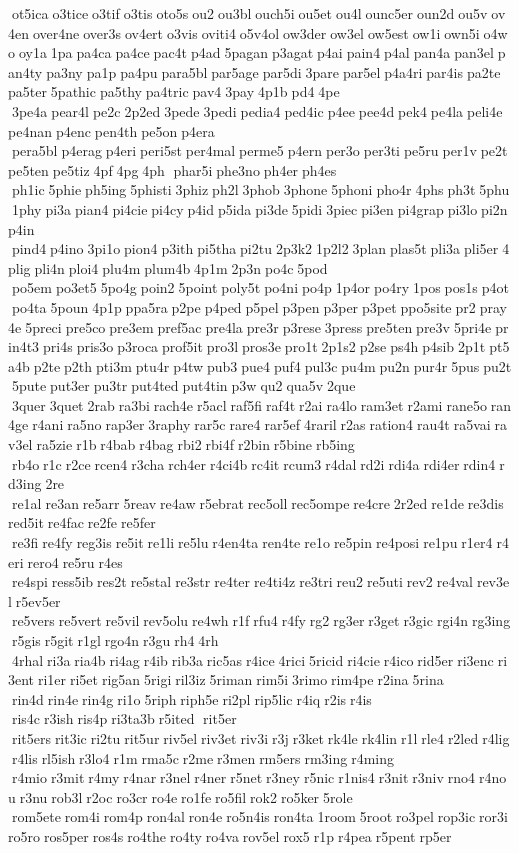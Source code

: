  ot5ica o3tice o3tif o3tis oto5s ou2 ou3bl ouch5i ou5et ou4l ounc5er oun2d ou5v ov4en over4ne over3s ov4ert o3vis oviti4 o5v4ol ow3der ow3el ow5est ow1i own5i o4wo oy1a 1pa pa4ca pa4ce pac4t p4ad 5pagan p3agat p4ai pain4 p4al pan4a pan3el pan4ty pa3ny pa1p pa4pu para5bl par5age par5di 3pare par5el p4a4ri par4is pa2te pa5ter 5pathic pa5thy pa4tric pav4 3pay 4p1b pd4 4pe  3pe4a pear4l pe2c 2p2ed 3pede 3pedi pedia4 ped4ic p4ee pee4d pek4 pe4la peli4e pe4nan p4enc pen4th pe5on p4era  pera5bl p4erag p4eri peri5st per4mal perme5 p4ern per3o per3ti pe5ru per1v pe2t pe5ten pe5tiz 4pf 4pg 4ph  phar5i phe3no ph4er ph4es  ph1ic 5phie ph5ing 5phisti 3phiz ph2l 3phob 3phone 5phoni pho4r 4phs ph3t 5phu 1phy pi3a pian4 pi4cie pi4cy p4id p5ida pi3de 5pidi 3piec pi3en pi4grap pi3lo pi2n p4in  pind4 p4ino 3pi1o pion4 p3ith pi5tha pi2tu 2p3k2 1p2l2 3plan plas5t pli3a pli5er 4plig pli4n ploi4 plu4m plum4b 4p1m 2p3n po4c 5pod  po5em po3et5 5po4g poin2 5point poly5t po4ni po4p 1p4or po4ry 1pos pos1s p4ot po4ta 5poun 4p1p ppa5ra p2pe p4ped p5pel p3pen p3per p3pet ppo5site pr2 pray4e 5preci pre5co pre3em pref5ac pre4la pre3r p3rese 3press pre5ten pre3v 5pri4e prin4t3 pri4s pris3o p3roca prof5it pro3l pros3e pro1t 2p1s2 p2se ps4h p4sib 2p1t pt5a4b p2te p2th pti3m ptu4r p4tw pub3 pue4 puf4 pul3c pu4m pu2n pur4r 5pus pu2t 5pute put3er pu3tr put4ted put4tin p3w qu2 qua5v 2que  3quer 3quet 2rab ra3bi rach4e r5acl raf5fi raf4t r2ai ra4lo ram3et r2ami rane5o ran4ge r4ani ra5no rap3er 3raphy rar5c rare4 rar5ef 4raril r2as ration4 rau4t ra5vai rav3el ra5zie r1b r4bab r4bag rbi2 rbi4f r2bin r5bine rb5ing  rb4o r1c r2ce rcen4 r3cha rch4er r4ci4b rc4it rcum3 r4dal rd2i rdi4a rdi4er rdin4 rd3ing 2re  re1al re3an re5arr 5reav re4aw r5ebrat rec5oll rec5ompe re4cre 2r2ed re1de re3dis red5it re4fac re2fe re5fer  re3fi re4fy reg3is re5it re1li re5lu r4en4ta ren4te re1o re5pin re4posi re1pu r1er4 r4eri rero4 re5ru r4es  re4spi ress5ib res2t re5stal re3str re4ter re4ti4z re3tri reu2 re5uti rev2 re4val rev3el r5ev5er  re5vers re5vert re5vil rev5olu re4wh r1f rfu4 r4fy rg2 rg3er r3get r3gic rgi4n rg3ing r5gis r5git r1gl rgo4n r3gu rh4 4rh  4rhal ri3a ria4b ri4ag r4ib rib3a ric5as r4ice 4rici 5ricid ri4cie r4ico rid5er ri3enc ri3ent ri1er ri5et rig5an 5rigi ril3iz 5riman rim5i 3rimo rim4pe r2ina 5rina  rin4d rin4e rin4g ri1o 5riph riph5e ri2pl rip5lic r4iq r2is r4is  ris4c r3ish ris4p ri3ta3b r5ited  rit5er  rit5ers rit3ic ri2tu rit5ur riv5el riv3et riv3i r3j r3ket rk4le rk4lin r1l rle4 r2led r4lig r4lis rl5ish r3lo4 r1m rma5c r2me r3men rm5ers rm3ing r4ming  r4mio r3mit r4my r4nar r3nel r4ner r5net r3ney r5nic r1nis4 r3nit r3niv rno4 r4nou r3nu rob3l r2oc ro3cr ro4e ro1fe ro5fil rok2 ro5ker 5role  rom5ete rom4i rom4p ron4al ron4e ro5n4is ron4ta 1room 5root ro3pel rop3ic ror3i ro5ro ros5per ros4s ro4the ro4ty ro4va rov5el rox5 r1p r4pea r5pent rp5er 